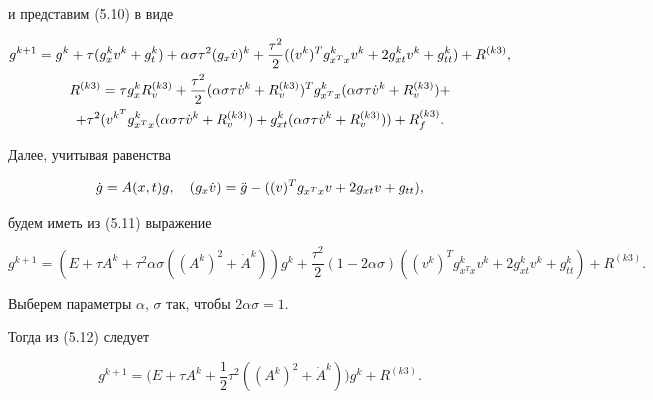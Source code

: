 и представим (5.10) в виде 


\begin{gather} 


g^{k+1}=g^k+\tau(g^k_x v^k+g^k_t)+\alpha\sigma\tau^2 


(g_x\Dot v)^k+\frac{\tau^2}{2}((v^k)^T g^k_{x^T x}v^k+ 


2g^k_{x t}v^k+g^k_{t t})+R^{(k3)}, \\ 


% 


R^{(k3)}=\tau g^k_x R^{(k3)}_v+\frac{\tau^2}{2} 


(\alpha\sigma\tau\Dot v^k+R^{(k3)}_v)^T g^k_{x^T x}


(\alpha\sigma\tau\Dot v^k


+ R^{(k3)}_v)+ \notag \\


+\tau^2(v^{k^T}g^k_{x^T x}(\alpha\sigma\tau\Dot v^k+R^{(k3)}_v)+ 


g^k_{x t}(\alpha\sigma\tau\Dot v^k+R^{(k3)}_v))+R^{(k3)}_f.\notag 


\end{gather} 


 


Далее, учитывая равенства 


$$ 


\Dot g=A(x,t)g,\quad (g_x\Dot v)=\Ddot g-((v)^T g_{x^T x}v 


+2g_{x t}v+g_{t t}), 


$$ 


будем иметь из (5.11) выражение 


\begin{equation} 


g^{k+1}=(E+\tau A^k+\tau^2\alpha\sigma((A^k)^2+\Dot A^k))g^k+ 


\frac{\tau^2}{2}(1-2\alpha\sigma)((v^k)^T g^k_{x^T x}v^k+ 


2g^k_{x t}v^k+g^k_{t t})+R^{(k3)}. 


\end{equation} 


 


Выберем параметры $\alpha$, $\sigma$ так, чтобы $2\alpha\sigma=1$. 


Тогда из (5.12) следует 


\begin{equation} 


g^{k+1}=\bigg(E+\tau A^k+\frac{1}{2}\tau^2((A^k)^2+ 


\Dot A^k)\bigg)g^k+R^{(k3)}. 


\end{equation} 



